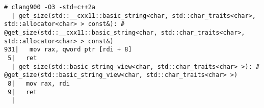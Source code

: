 \begin{lstlisting}[language={},numbers=none,title=\href{https://godbolt.org/z/Yv6dWE}{\texttt{godbolt.org/z/Yv6dWE}}]
# clang900 -O3 -std=c++2a
  | get_size(std::__cxx11::basic_string<char, std::char_traits<char>, std::allocator<char> > const&): # @get_size(std::__cxx11::basic_string<char, std::char_traits<char>, std::allocator<char> > const&)
931|   mov rax, qword ptr [rdi + 8]
 5|   ret
  | get_size(std::basic_string_view<char, std::char_traits<char> >): # @get_size(std::basic_string_view<char, std::char_traits<char> >)
 8|   mov rax, rdi
 9|   ret
  |
\end{lstlisting}
